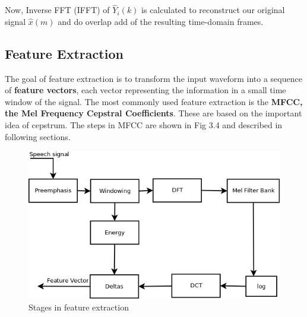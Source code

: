 Now, Inverse FFT (IFFT) of $\hat{Y}_i(k)$ is calculated to reconstruct our original signal $\hat{x}(m)$ and do overlap add of the resulting time-domain frames.



\subsection{Feature Extraction}
The goal of feature extraction is to transform the input waveform into a sequence of \textbf{feature vectors}, each vector representing the information in a small time window of the signal. The most commonly used feature extraction is the \textbf{MFCC, the Mel Frequency Cepstral Coefficients}. These are based on the important idea of cepstrum. The steps in MFCC are shown in Fig 3.4 and described in following sections. 

\begin{figure}[h]
	\begin{center}
		\includegraphics[scale=0.3]{images/feature-blockdiagram.png}
		\caption{Stages in feature extraction}
		\label{feature}
	\end{center}
\end{figure}

